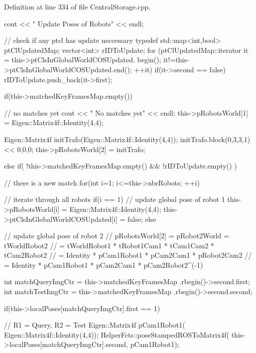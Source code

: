 \-Definition at line 334 of file \-Central\-Storage.\-cpp.


\begin{DoxyCode}
                                         {
        cout << "       Update Poses of Robots" << endl;

        // check if any ptcl has update neccessary
        typedef std::map<int,bool> ptClUpdatedMap;
        vector<int> rIDToUpdate;
        for (ptClUpdatedMap::iterator it = this->ptClsInGlobalWorldCOSUpdated.
      begin(); it!=this->ptClsInGlobalWorldCOSUpdated.end(); ++it) {
                if(it->second == false) {
                        rIDToUpdate.push_back(it->first);
                }
        }

        if(this->matchedKeyFramesMap.empty()) { // no matches yet
                cout << "               No matches yet" << endl;
                this->pRobotsWorld[1] = Eigen::Matrix4f::Identity(4,4);

                Eigen::Matrix4f initTrafo(Eigen::Matrix4f::Identity(4,4));
                initTrafo.block(0,3,3,1) << 0,0,0;
                this->pRobotsWorld[2] = initTrafo;
        }
        else if( !this->matchedKeyFramesMap.empty() && !rIDToUpdate.empty() ) {
       // there is a new match
                for(int i=1; i<=this->nbrRobots; ++i) { // iterate through all
       robots
                        if(i == 1) { // update global pose of robot 1
                                this->pRobotsWorld[i] = 
      Eigen::Matrix4f::Identity(4,4);
                                this->ptClsInGlobalWorldCOSUpdated[i] = false;
                        }
                        else { // update global pose of robot 2
                                // pRobotsWorld[2] = pRobot2World =
       tWorldRobot2
                                // = tWorldRobot1 * tRobot1Cam1 * tCam1Cam2 *
       tCam2Robot2
                                // = Identity     * pCam1Robot1 * pCam2Cam1 *
       pRobot2Cam2
                                // = Identity     * pCam1Robot1 * pCam2Cam1 *
       pCam2Robot2^(-1)

                                int matchQueryImgCtr = this->matchedKeyFramesMap
      .rbegin()->second.first;
                                int matchTestImgCtr = this->matchedKeyFramesMap
      .rbegin()->second.second;

                                if(this->localPoses[matchQueryImgCtr].first == 
      1) {
                                        // R1 = Query, R2 = Test
                                        Eigen::Matrix4f pCam1Robot1(
      Eigen::Matrix4f::Identity(4,4));
                                        HelperFcts::poseStampedROSToMatrix4f(
      this->localPoses[matchQueryImgCtr].second, pCam1Robot1);

}}}}}
\end{DoxyCode}
